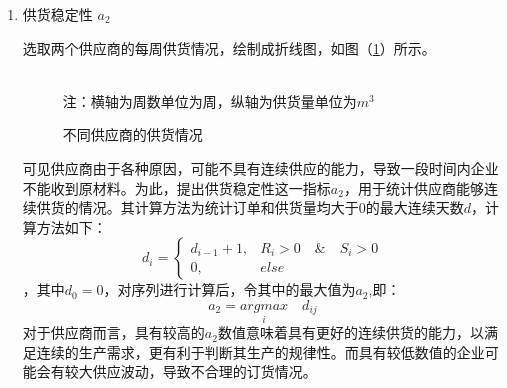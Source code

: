 \documentclass{my_paper}
\begin{document}
\begin{enumerate}
    \item 供货稳定性 $a_2$
    
    选取两个供应商的每周供货情况，绘制成折线图，如图（\ref{11}）所示。
    \begin{figure}[htbp]
        \centering  %
        \\
        注：横轴为周数单位为周，纵轴为供货量单位为$m^3$
    
        \caption{不同供应商的供货情况}    %
        \label{11}    %
    \end{figure}
    \newpage
    可见供应商由于各种原因，可能不具有连续供应的能力，导致一段时间内企业不能收到原材料。为此，提出供货稳定性这一指标$a_2$，用于统计供应商能够连续供货的情况。其计算方法为统计订单和供货量均大于0的最大连续天数$d$，计算方法如下：
    \begin{equation}
    d_i = \begin{cases}
        d_{i-1}+1,&R_i>0 \quad\&\quad S_i>0\\
        0, & else
    \end{cases}
    \label{d}
    \end{equation}
    ，其中$d_0=0$，对序列进行计算后，令其中的最大值为$a_2$,即：
    \begin{equation}
    a_2=\underset{i}{argmax}\quad d_{ij}
    \label{a2}
    \end{equation}
    对于供应商而言，具有较高的$a_2$数值意味着具有更好的连续供货的能力，以满足连续的生产需求，更有利于判断其生产的规律性。而具有较低数值的企业可能会有较大供应波动，导致不合理的订货情况。


\end{enumerate}
\end{document}
